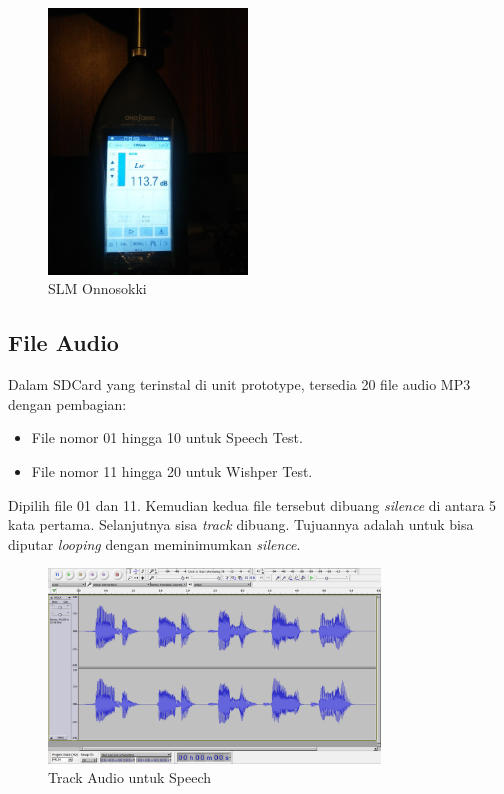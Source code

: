 \documentclass[12pt,]{article}
\begin{document}
\begin{itemize}
		\newpage
		\begin{figure}[!ht]
			\centering
			\includegraphics[width=150pt]{images/slm_calib}
			\caption{SLM Onnosokki}
		\end{figure}

	\end{itemize}

	\subsection{File Audio}

	Dalam SDCard yang terinstal di unit prototype, tersedia 20 file audio MP3 dengan pembagian:
	\begin{itemize}
		\item File nomor 01 hingga 10 untuk Speech Test.
		\item File nomor 11 hingga 20 untuk Wishper Test.
	\end{itemize}

	Dipilih file 01 dan 11.
	Kemudian kedua file tersebut dibuang \textit{silence} di antara 5 kata pertama.
	Selanjutnya sisa \textit{track} dibuang.
	Tujuannya adalah untuk bisa diputar \textit{looping} dengan meminimumkan \textit{silence}.

	\begin{figure}[!ht]
		\centering
		\includegraphics[width=250pt]{images/elitech_testAudioSpeech}
		\caption{Track Audio untuk Speech}
	\end{figure}
\end{document}
